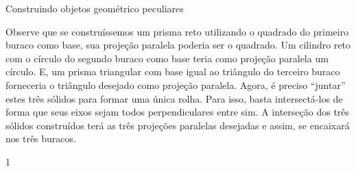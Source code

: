 \begin{answer}{Construindo objetos geométrico peculiares}
{\begin{enumerate}
Observe que se construíssemos um prisma reto utilizando o quadrado do primeiro buraco como base, sua projeção paralela poderia ser o quadrado. Um cilindro reto com o círculo do segundo buraco como base teria como projeção paralela um círculo. E, um prisma triangular com base igual ao triângulo do terceiro buraco forneceria o triângulo desejado como projeção paralela. Agora, é preciso “juntar” estes três sólidos para formar uma única rolha. Para isso, basta intersectá-los de forma que seus eixos sejam todos perpendiculares entre sim. A interseção dos três sólidos construídos terá as três projeções paralelas desejadas e assim, se encaixará nos três buracos.
\end{enumerate}
}{1}
\end{answer}


\practice{}
\label{\detokenize{GE301-4::doc}}\label{\detokenize{GE301-4:praticando-1}}\label{\detokenize{GE301-4:ativ-proj-feixe-de-retas}}
